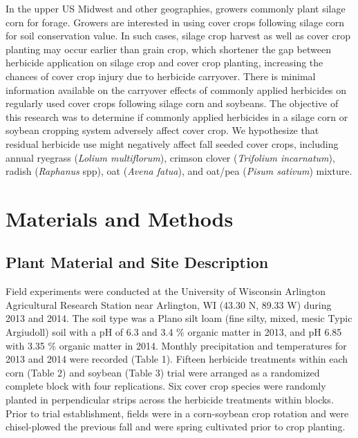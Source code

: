 \documentclass[agriculture,article,submit,moreauthors,pdftex]{mdpi}
\begin{document}
In the upper US Midwest and other geographies, growers commonly plant
silage corn for forage. Growers are interested in using cover crops
following silage corn for soil conservation value. In such cases, silage
crop harvest as well as cover crop planting may occur earlier than grain
crop, which shortener the gap between herbicide application on silage
crop and cover crop planting, increasing the chances of cover crop
injury due to herbicide carryover. There is minimal information
available on the carryover effects of commonly applied herbicides on
regularly used cover crops following silage corn and soybeans. The
objective of this research was to determine if commonly applied
herbicides in a silage corn or soybean cropping system adversely affect
cover crop. We hypothesize that residual herbicide use might negatively
affect fall seeded cover crops, including annual ryegrass (\emph{Lolium
multiflorum}), crimson clover (\emph{Trifolium incarnatum}), radish
(\emph{Raphanus} spp), oat (\emph{Avena fatua}), and oat/pea
(\emph{Pisum sativum}) mixture.

\hypertarget{materials-and-methods}{%
\section{Materials and Methods}\label{materials-and-methods}}

\hypertarget{plant-material-and-site-description}{%
\subsection{Plant Material and Site
Description}\label{plant-material-and-site-description}}

Field experiments were conducted at the University of Wisconsin
Arlington Agricultural Research Station near Arlington, WI (43.30 N,
89.33 W) during 2013 and 2014. The soil type was a Plano silt loam (fine
silty, mixed, mesic Typic Argiudoll) soil with a pH of 6.3 and 3.4 \%
organic matter in 2013, and pH 6.85 with 3.35 \% organic matter in 2014.
Monthly precipitation and temperatures for 2013 and 2014 were recorded
(Table 1). Fifteen herbicide treatments within each corn (Table 2) and
soybean (Table 3) trial were arranged as a randomized complete block
with four replications. Six cover crop species were randomly planted in
perpendicular strips across the herbicide treatments within blocks.
Prior to trial establishment, fields were in a corn-soybean crop
rotation and were chisel-plowed the previous fall and were spring
cultivated prior to crop planting.
\end{document}
